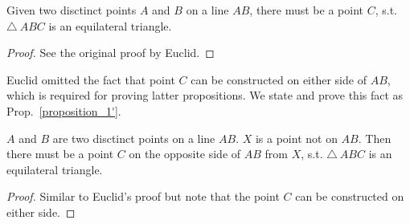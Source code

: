 \begin{proposition}\label{proposition_1}\leanok
    Given two disctinct points $A$ and $B$ on a line $AB$, there must be a point $C$, s.t. $\triangle~ABC$ is an equilateral triangle.
\end{proposition}
\begin{proof}
    \leanok
    See the original proof by Euclid.
\end{proof}

Euclid omitted the fact that point $C$ can be constructed on either side of $AB$, which is required for proving latter propositions.
We state and prove this fact as Prop.~\ref{proposition_1'}.

\begin{proposition}\label{proposition_1'}\leanok
    $A$ and $B$ are two disctinct points on a line $AB$. $X$ is a point not on $AB$. Then there must be a point $C$ on the opposite side of $AB$ from $X$, s.t. $\triangle~ABC$ is an equilateral triangle.
\end{proposition}
\begin{proof}
    \leanok
    Similar to Euclid's proof but note that the point $C$ can be constructed on either side.
\end{proof}